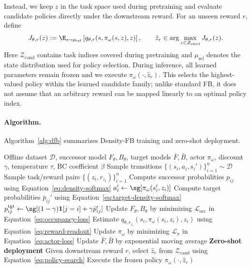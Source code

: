 Instead, we keep $z$ in the task space used during pretraining and evaluate candidate policies directly under the downstream reward. 
For an unseen reward $r$, define
\begin{equation}
    J_{\theta,r}(z) := \E_{s\sim\mu_{\mathrm{sel}}}\left[q_{\theta,r}(s,\pi_\omega(s,z),z)\right], \qquad \hat z_r\in\arg\max_{z\in\mathcal Z_{\mathrm{cand}}}J_{\theta,r}(z).
    \label{eq:policy-search}
\end{equation}
Here $\mathcal Z_{\mathrm{cand}}$ contains task indices covered during pretraining and $\mu_{\mathrm{sel}}$ denotes the state distribution used for policy selection. 
During inference, all learned parameters remain frozen and we execute $\pi_\omega(\cdot,\hat z_r)$. 
This selects the highest-valued policy within the learned candidate family; 
unlike standard FB, it does not assume that an arbitrary reward can be mapped linearly to an optimal policy index.

\paragraph{Algorithm.}
Algorithm~\ref{alg:dfb} summarizes Density-FB training and zero-shot deployment.

\begin{algorithm}[t]
\caption{Density-FB}
\label{alg:dfb}
\begin{algorithmic}[1]
\Require Offline dataset $\mathcal D$, successor model $F_\theta,B_\theta$, target models $\bar F,\bar B$, actor $\pi_\omega$, discount $\gamma$, temperature $\tau$, BC coefficient $\beta$
    \State Sample transitions $\{(s_i,a_i,s_i')\}_{i=1}^{n}\sim\mathcal D$
    \State Sample task/reward pairs $\{(z_i,r_{z_i})\}_{i=1}^{n}$
    \State Compute successor probabilities $p_{ij}$ using Equation~\eqref{eq:density-softmax}
    \State $a_i'\gets\sg[\pi_\omega(s_i',z_i)]$
    \State Compute target probabilities $\bar p_{ij}'$ using Equation~\eqref{eq:target-density-softmax}
    \State $p_{ij}^{\mathrm{tgt}}\gets\sg[(1-\gamma)\mathbf 1[j=i]+\gamma\bar p_{ij}']$
    \State Update $F_\theta,B_\theta$ by minimizing $\mathcal L_{\mathrm{occ}}$ in Equation~\eqref{eq:occupancy-loss}
    \State Estimate $q_{\theta,r_{z_i}}(s_i,\pi_\omega(s_i,z_i),z_i)$ using Equation~\eqref{eq:reward-readout}
    \State Update $\pi_\omega$ by minimizing $\mathcal L_\pi$ in Equation~\eqref{eq:actor-loss}
    \State Update $\bar F,\bar B$ by exponential moving average
\EndFor
\Statex
\Statex \textbf{Zero-shot deployment}
\State Given downstream reward $r$, select $\hat z_r$ from $\mathcal Z_{\mathrm{cand}}$ using Equation~\eqref{eq:policy-search}
\State Execute the frozen policy $\pi_\omega(\cdot,\hat z_r)$
\end{algorithmic}
\end{algorithm}